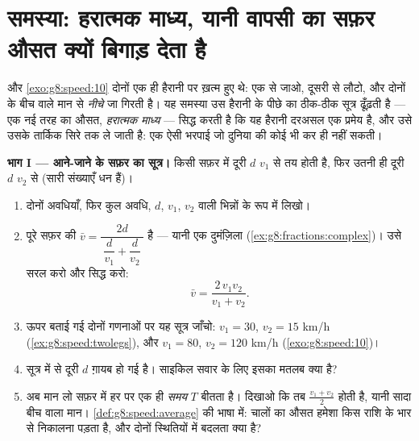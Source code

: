 \section{समस्या: हरात्मक माध्य, यानी वापसी का सफ़र औसत क्यों बिगाड़
देता है}

\begin{problem}
\label{pb:g8:speed:1}
 और \cref{exo:g8:speed:10} दोनों एक ही
हैरानी पर ख़त्म हुए थे: एक  से जाओ, दूसरी से लौटो, और 
दोनों के बीच वाले मान से \emph{नीचे} जा गिरती है। यह समस्या उस
हैरानी के पीछे का ठीक-ठीक सूत्र ढूँढ़ती है --- एक नई तरह का औसत,
\emph{हरात्मक माध्य} --- सिद्ध करती है कि यह
हैरानी दरअसल एक प्रमेय है, और उसे उसके तार्किक सिरे तक ले जाती है:
एक ऐसी भरपाई जो दुनिया की कोई भी  कर ही नहीं सकती।

\medskip
\noindent\textbf{भाग I --- आने-जाने के सफ़र का सूत्र।}
किसी सफ़र में दूरी $d$  $v_1$ से तय होती है, फिर उतनी ही दूरी $d$
 $v_2$ से (सारी संख्याएँ धन हैं)।
\begin{enumerate}
  \item दोनों अवधियाँ, फिर कुल अवधि, $d$, $v_1$, $v_2$ वाली
        भिन्नों के रूप में लिखो।
  \item पूरे सफ़र की 
        $\bar v = \dfrac{2d}{\ \dfrac{d}{v_1} + \dfrac{d}{v_2}\ }$
        है --- यानी एक दुमंज़िला 
        (\cref{ex:g8:fractions:complex})। उसे सरल करो और सिद्ध
        करो:
        \[
        \bar v = \frac{2\, v_1 v_2}{v_1 + v_2} .
        \]
  \item ऊपर बताई गई दोनों गणनाओं पर यह सूत्र जाँचो: $v_1 = 30$,
        $v_2 = 15$ km/h (\cref{ex:g8:speed:twolegs}), और
        $v_1 = 80$, $v_2 = 120$ km/h (\cref{exo:g8:speed:10})।
  \item सूत्र में से दूरी $d$ ग़ायब हो गई है। साइकिल सवार के लिए
        इसका  मतलब क्या है?
  \item अब मान लो सफ़र में हर  पर एक ही \emph{समय} $T$ बीतता है।
        दिखाओ कि तब  $\frac{v_1 + v_2}{2}$ होती है, यानी
        सादा बीच वाला मान। \cref{def:g8:speed:average} की भाषा
        में: चालों का औसत हमेशा किस राशि के भार से निकालना पड़ता
        है, और दोनों स्थितियों में बदलता क्या है?
\end{enumerate}


\end{problem}
